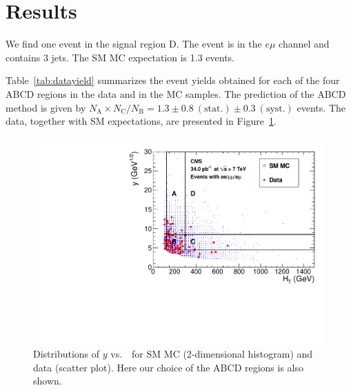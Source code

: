 \section{Results}
\label{sec:results}

We find one event in the signal region D. The event is in the $e\mu$ channel and contains 3 jets.
The SM MC expectation is 1.3 events.

Table~\ref{tab:datayield} summarizes the event yields obtained for each of the four ABCD 
regions in the data and in the  MC samples.
The prediction of the ABCD method is given by 
$N_\textrm{A}\times{}N_\textrm{C}/N_\textrm{B} = 1.3 \pm 0.8~(\textrm{stat.}) \pm 0.3~(\textrm{syst.})$ events.
The data, together with SM expectations, are presented in Figure~\ref{fig:abcdData}.

\begin{figure}[tbh]
\begin{center}
\includegraphics[width=0.75\linewidth]{plots_final/abcd.pdf}
\caption{\label{fig:abcdData}\protect Distributions of $y$ vs.\ \HT\   
for SM MC (2-dimensional histogram) and data (scatter plot).  Here  our 
choice of the ABCD regions is also shown.}
\end{center}
\end{figure}


